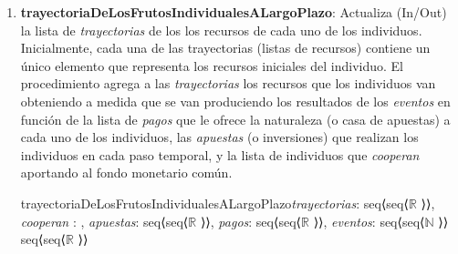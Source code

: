 \documentclass[10pt,a4paper]{article}
\begin{document}
\begin{enumerate}
    \item \textbf{trayectoriaDeLosFrutosIndividualesALargoPlazo}: Actualiza (In/Out) la lista de \textit{trayectorias} de los los recursos de cada uno de los individuos. Inicialmente, cada una de las trayectorias (listas de recursos) contiene un único elemento que representa los recursos iniciales del individuo. El procedimiento agrega a las \textit{trayectorias} los recursos que los individuos van obteniendo a medida que se van produciendo los resultados de los \textit{eventos} en función de la lista de \textit{pagos} que le ofrece la naturaleza (o casa de apuestas) a cada uno de los individuos, las \textit{apuestas} (o inversiones) que realizan los individuos en cada paso temporal, y la lista de individuos que \textit{cooperan} aportando al fondo monetario común.
    
    \begin{proc}{trayectoriaDeLosFrutosIndividualesALargoPlazo}{\Inout \textit{trayectorias}:
        seq⟨seq⟨$%
        \mathbb{R}
        $%
        ⟩⟩, \In \textit{cooperan} : , \In \textit{apuestas}:
        seq⟨seq⟨$%
        \mathbb{R}
        $%
        ⟩⟩, \In \textit{pagos}:
        seq⟨seq⟨$%
        \mathbb{R}
        $%
        ⟩⟩, \In \textit{eventos}:
        seq⟨seq⟨$%
        \mathbb{N}
        $%
        ⟩⟩}
    {
        seq⟨seq⟨$%
    \mathbb{R}
    $%
    ⟩⟩
    }
        \requiere{}

        \asegura{}

    \end{proc}


\end{enumerate}
\end{document}
